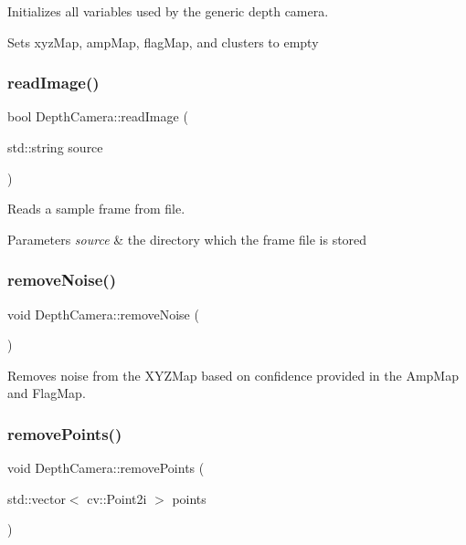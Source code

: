 Initializes all variables used by the generic depth camera. 

Sets xyz\+Map, amp\+Map, flag\+Map, and clusters to empty \hypertarget{class_depth_camera_a21cf887a447d2cdfda6ac907662c55fe}{}\label{class_depth_camera_a21cf887a447d2cdfda6ac907662c55fe} 
\subsubsection{\texorpdfstring{read\+Image()}{readImage()}}
{\footnotesize\ttfamily bool Depth\+Camera\+::read\+Image (\begin{DoxyParamCaption}\item[{std\+::string}]{source }\end{DoxyParamCaption})}



Reads a sample frame from file. 


\begin{DoxyParams}{Parameters}
{\em source} & the directory which the frame file is stored \\
\hline
\end{DoxyParams}
\hypertarget{class_depth_camera_adc06db6509cc5f47de1e168f56bf41fa}{}\label{class_depth_camera_adc06db6509cc5f47de1e168f56bf41fa} 
\subsubsection{\texorpdfstring{remove\+Noise()}{removeNoise()}}
{\footnotesize\ttfamily void Depth\+Camera\+::remove\+Noise (\begin{DoxyParamCaption}{ }\end{DoxyParamCaption})}



Removes noise from the X\+Y\+Z\+Map based on confidence provided in the Amp\+Map and Flag\+Map. 

\hypertarget{class_depth_camera_a8f38ced63dcfb0c4c56cb7d4e940bcd8}{}\label{class_depth_camera_a8f38ced63dcfb0c4c56cb7d4e940bcd8} 
\subsubsection{\texorpdfstring{remove\+Points()}{removePoints()}}
{\footnotesize\ttfamily void Depth\+Camera\+::remove\+Points (\begin{DoxyParamCaption}\item[{std\+::vector$<$ cv\+::\+Point2i $>$}]{points }\end{DoxyParamCaption})}



